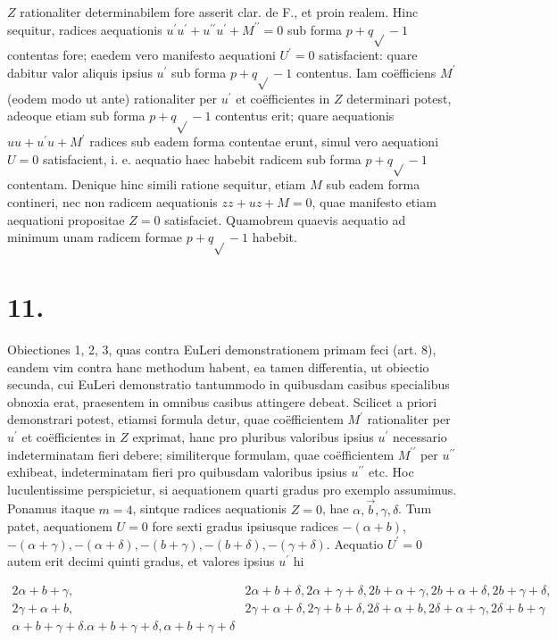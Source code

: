 \documentclass[10pt]{article}
\begin{document}
\(Z\) rationaliter determinabilem fore asserit clar. de F., et proin realem. Hinc sequitur, radices aequationis \(u^{\prime} u^{\prime}+u^{\prime \prime} u^{\prime}+M^{\prime \prime}=0\) sub forma \(p+q \sqrt{ }-1\) contentas fore; eaedem vero manifesto aequationi \(U^{\prime}=0\) satisfacient: quare dabitur valor aliquis ipsius \(u^{\prime}\) sub forma \(p+q \sqrt{ }-1\) contentus. Iam coëfficiens \(M^{\prime}\) (eodem modo ut ante) rationaliter per \(u^{\prime}\) et coëfficientes in \(Z\) determinari potest, adeoque etiam sub forma \(p+q \sqrt{ }-1\) contentus erit; quare aequationis \(u u+u^{\prime} u+M^{\prime}\) radices sub eadem forma contentae erunt, simul vero aequationi \(U=0\) satisfacient, i. e. aequatio haec habebit radicem sub forma \(p+q \sqrt{ }-1\) contentam. Denique hinc simili ratione sequitur, etiam \(M\) sub eadem forma contineri, nec non radicem aequationis \(z z+u z+M=0\), quae manifesto etiam aequationi propositae \(Z=0\) satisfaciet. Quamobrem quaevis aequatio ad minimum unam radicem formae \(p+q \sqrt{ }-1\) habebit.

\section*{11.}
Obiectiones 1, 2, 3, quas contra EuLeri demonstrationem primam feci (art. 8), eandem vim contra hanc methodum habent, ea tamen differentia, ut obiectio secunda, cui EuLeri demonstratio tantummodo in quibusdam casibus specialibus obnoxia erat, praesentem in omnibus casibus attingere debeat. Scilicet a priori demonstrari potest, etiamsi formula detur, quae coëfficientem \(M^{\prime}\) rationaliter per \(u^{\prime}\) et coëfficientes in \(Z\) exprimat, hanc pro pluribus valoribus ipsius \(u^{\prime}\) necessario indeterminatam fieri debere; similiterque formulam, quae coëfficientem \(M^{\prime \prime}\) per \(u^{\prime \prime}\) exhibeat, indeterminatam fieri pro quibusdam valoribus ipsius \(u^{\prime \prime}\) etc. Hoc luculentissime perspicietur, si aequationem quarti gradus pro exemplo assumimus. Ponamus itaque \(m=4\), sintque radices aequationis \(Z=0\), hae \(\alpha, \vec{b}, \gamma, \delta\). Tum patet, aequationem \(U=0\) fore sexti gradus ipsiusque radices \(-(\alpha+b)\), \(-(\alpha+\gamma),-(\alpha+\delta),-(b+\gamma),-(b+\delta),-(\gamma+\delta)\). Aequatio \(U^{\prime}=0\) autem erit decimi quinti gradus, et valores ipsius \(u^{\prime}\) hi

\[
\begin{array}{cc}
2 \alpha+b+\gamma, & 2 \alpha+b+\delta, 2 \alpha+\gamma+\delta, 2 b+\alpha+\gamma, 2 b+\alpha+\delta, 2 b+\gamma+\delta, \\
2 \gamma+\alpha+b, & 2 \gamma+\alpha+\delta, 2 \gamma+b+\delta, 2 \delta+\alpha+b, 2 \delta+\alpha+\gamma, 2 \delta+b+\gamma \\
\alpha+b+\gamma+\delta . \alpha+b+\gamma+\delta, \alpha+b+\gamma+\delta
\end{array}
\]
\end{document}
